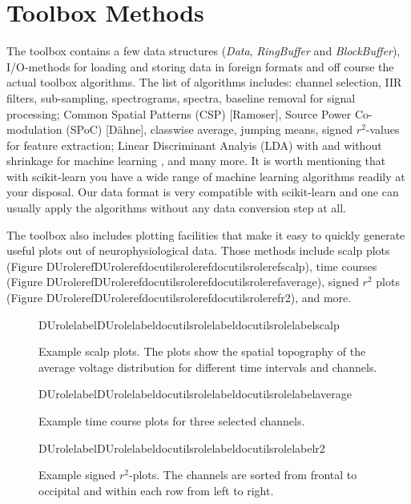 \documentclass[letterpaper,compsoc,twoside]{IEEEtran}
\providecommand*{\DUrole}[2]{\ifcsname DUrole#1\endcsname \csname DUrole#1\endcsname{#2}\else \ifcsname docutilsrole#1\endcsname \csname docutilsrole#1\endcsname{#2}\else #2\fi \fi }
\newenvironment{DUlegend}{\small}{}
\providecommand*{\DUroletitlereference}[1]{\textsl{#1}}
\begin{document}
\section{Toolbox Methods\label{toolbox-methods}}


The toolbox contains a few data structures (\DUroletitlereference{Data}, \DUroletitlereference{RingBuffer} and
\DUroletitlereference{BlockBuffer}), I/O-methods for loading and storing data in foreign formats and
off course the actual toolbox algorithms. The list of algorithms includes:
channel selection, IIR filters, sub-sampling, spectrograms, spectra, baseline
removal for signal processing; Common Spatial Patterns (CSP) {[}Ramoser{]}, Source
Power Co-modulation (SPoC) {[}Dähne{]}, classwise average, jumping means, signed
$r^2$-values for feature extraction; Linear Discriminant Analyis (LDA)
with and without shrinkage for machine learning \cite{Blankertz}, and many more. It
is worth mentioning that with scikit-learn you have a wide range of machine
learning algorithms readily at your disposal. Our data format is very compatible
with scikit-learn and one can usually apply the algorithms without any data
conversion step at all.

The toolbox also includes plotting facilities that make it easy to quickly
generate useful plots out of neurophysiological data. Those methods include
scalp plots (Figure \DUrole{ref}{scalp}), time courses (Figure \DUrole{ref}{average}), signed
$r^2$ plots (Figure \DUrole{ref}{r2}), and more.\begin{figure}[]\noindent{}
\caption{Example scalp plots. The plots show the spatial topography of the average
voltage distribution for different time intervals and channels.}
\begin{DUlegend}

\DUrole{label}{scalp}\end{DUlegend}
\end{figure}\begin{figure}[]\noindent{}
\caption{Example time course plots for three selected channels.}
\begin{DUlegend}

\DUrole{label}{average}\end{DUlegend}
\end{figure}\begin{figure}[]\noindent{}
\caption{Example signed $r^2$-plots. The channels are sorted from frontal to
occipital and within each row from left to right.}
\begin{DUlegend}

\DUrole{label}{r2}\end{DUlegend}
\end{figure}
\end{document}

